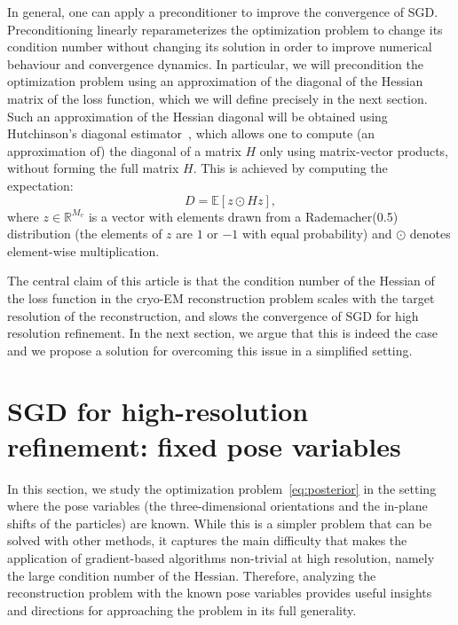 \documentclass{article}
\begin{document}
In general, one can apply a preconditioner to improve the convergence of SGD. 
Preconditioning linearly reparameterizes the optimization problem to change its condition number without changing its solution in order to improve numerical behaviour and convergence dynamics.
In particular, we will precondition the optimization problem using an approximation of the diagonal of the Hessian matrix of the loss function, which we will define precisely in the next section.
Such an approximation of the Hessian diagonal will be obtained using 
Hutchinson's diagonal estimator~\cite{bekas_estimator_2007}, which allows one to 
compute (an approximation of) the diagonal of a matrix $H$ only using 
matrix-vector products, without forming the full matrix $H$.
This is achieved by computing the expectation:
\begin{equation}
    D = \mathbb{E}[z \odot Hz],
    \label{eq:hutch}
\end{equation}
where $z \in \mathbb{R}^{M_v}$ is a vector with elements drawn from a Rademacher(0.5) 
distribution (the elements of $z$ are $1$ or $-1$ with equal probability) and 
$\odot$ denotes element-wise multiplication. 

The central claim of this article is that the condition number of the Hessian of 
the loss function in the cryo-EM reconstruction problem scales with 
the target resolution of the reconstruction, and slows the convergence 
of SGD for high resolution refinement. In the next section, we argue that this is 
indeed the case and we propose a solution for overcoming this issue in a simplified setting.

\section{SGD for high-resolution refinement: fixed pose variables}
\label{sec:main}

In this section, we study the optimization problem~\eqref{eq:posterior} in the
setting where the pose variables (the three-dimensional orientations and the in-plane 
shifts of the particles) are known. While this is a simpler problem that can be 
solved with other methods, it captures the main difficulty that makes the application 
of gradient-based algorithms non-trivial at high resolution, namely the large condition 
number of the Hessian. Therefore, analyzing the reconstruction problem with the 
known pose variables provides useful insights and directions for approaching the 
problem in its full generality.
\end{document}
